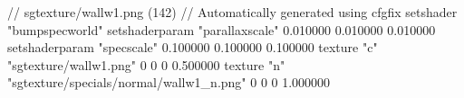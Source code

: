 // sgtexture/wallw1.png (142)
// Automatically generated using cfgfix
setshader "bumpspecworld"
setshaderparam "parallaxscale" 0.010000 0.010000 0.010000
setshaderparam "specscale" 0.100000 0.100000 0.100000
texture "c" "sgtexture/wallw1.png" 0 0 0 0.500000
texture "n" "sgtexture/specials/normal/wallw1_n.png" 0 0 0 1.000000
